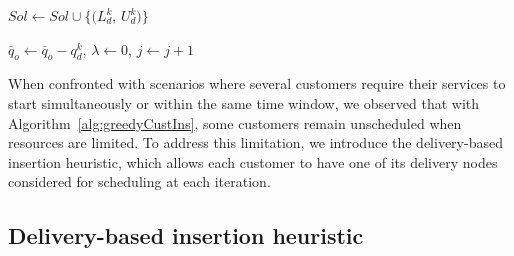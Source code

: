 \documentclass[authoryear,preprint,review,11pt]{elsarticle}
\begin{document}
{\begin{algorithm}[!ht]
{{{{    $Sol \leftarrow Sol \cup \{(L^k_{d}$, $U^k_{d})\}  $

        $\bar{q}_o \leftarrow \bar{q}_o-q^k_{d}$, $\lambda \leftarrow 0$, $j \leftarrow j+1$

    }

                }
            }
        }
    \end{algorithm}
}
When confronted with scenarios where several customers require their services to start simultaneously or within the same time window, we observed that with Algorithm~\ref{alg:greedyCustIns}, some customers remain unscheduled when resources are limited. To address this limitation, we introduce the delivery-based insertion heuristic, which allows each customer to have one of its delivery nodes considered for scheduling at each iteration.

\subsection{Delivery-based insertion heuristic}
\end{document}
